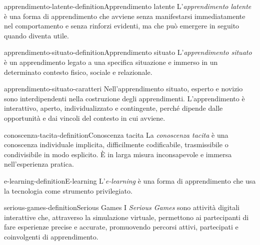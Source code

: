 \documentclass[preview]{standalone}
\begin{document}

\begin{snippetdefinition}{apprendimento-latente-definition}{Apprendimento latente}
    L'\emph{apprendimento latente} è una forma di apprendimento che avviene
    senza manifestarsi immediatamente nel comportamento e senza rinforzi
    evidenti, ma che può emergere in seguito quando diventa utile.
\end{snippetdefinition}

\begin{snippetdefinition}{apprendimento-situato-definition}{Apprendimento situato}
    L'\emph{apprendimento situato} è un apprendimento legato a una specifica
    situazione e immerso in un determinato contesto fisico, sociale e relazionale.
\end{snippetdefinition}

\begin{snippet}{apprendimento-situato-caratteri}
    Nell'apprendimento situato, esperto e novizio sono interdipendenti nella
    costruzione degli apprendimenti. L'apprendimento è interattivo, aperto,
    individualizzato e contingente, perché dipende dalle opportunità e dai
    vincoli del contesto in cui avviene.
\end{snippet}

\begin{snippetdefinition}{conoscenza-tacita-definition}{Conoscenza tacita}
    La \emph{conoscenza tacita} è una conoscenza individuale implicita,
    difficilmente codificabile, trasmissibile o condivisibile in modo esplicito.
    È in larga misura inconsapevole e immersa nell'esperienza pratica.
\end{snippetdefinition}

\begin{snippetdefinition}{e-learning-definition}{E-learning}
    L'\emph{e-learning} è una forma di apprendimento che usa la tecnologia come
    strumento privilegiato.
\end{snippetdefinition}

\begin{snippetdefinition}{serious-games-definition}{Serious Games}
    I \emph{Serious Games} sono attività digitali interattive che, attraverso la
    simulazione virtuale, permettono ai partecipanti di fare esperienze precise
    e accurate, promuovendo percorsi attivi, partecipati e coinvolgenti di
    apprendimento.
\end{snippetdefinition}
\end{document}
